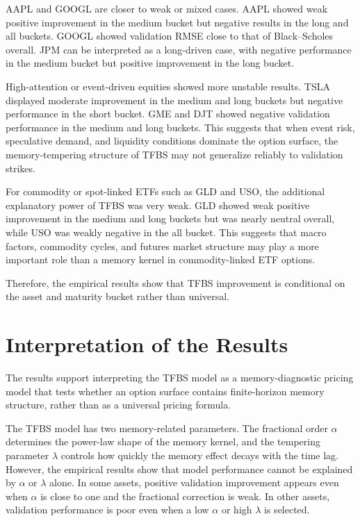 \documentclass[11pt,a4paper]{report}
\begin{document}
AAPL and GOOGL are closer to weak or mixed cases. AAPL showed weak positive improvement in the medium bucket but negative results in the long and all buckets. GOOGL showed validation RMSE close to that of Black--Scholes overall. JPM can be interpreted as a long-driven case, with negative performance in the medium bucket but positive improvement in the long bucket.

High-attention or event-driven equities showed more unstable results. TSLA displayed moderate improvement in the medium and long buckets but negative performance in the short bucket. GME and DJT showed negative validation performance in the medium and long buckets. This suggests that when event risk, speculative demand, and liquidity conditions dominate the option surface, the memory-tempering structure of TFBS may not generalize reliably to validation strikes.

For commodity or spot-linked ETFs such as GLD and USO, the additional explanatory power of TFBS was very weak. GLD showed weak positive improvement in the medium and long buckets but was nearly neutral overall, while USO was weakly negative in the all bucket. This suggests that macro factors, commodity cycles, and futures market structure may play a more important role than a memory kernel in commodity-linked ETF options.

Therefore, the empirical results show that TFBS improvement is conditional on the asset and maturity bucket rather than universal.

\section{Interpretation of the Results}

The results support interpreting the TFBS model as a memory-diagnostic pricing model that tests whether an option surface contains finite-horizon memory structure, rather than as a universal pricing formula.

The TFBS model has two memory-related parameters. The fractional order $\alpha$ determines the power-law shape of the memory kernel, and the tempering parameter $\lambda$ controls how quickly the memory effect decays with the time lag. However, the empirical results show that model performance cannot be explained by $\alpha$ or $\lambda$ alone. In some assets, positive validation improvement appears even when $\alpha$ is close to one and the fractional correction is weak. In other assets, validation performance is poor even when a low $\alpha$ or high $\lambda$ is selected.
\end{document}
